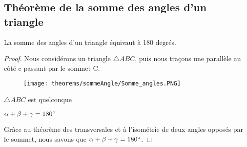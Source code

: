 \documentclass[a4paper,12pt]{article}
\begin{document}
\pagebreak
\subsection{Théorème de la somme des angles d'un triangle}
\begin{theorem}
La somme des angles d'un triangle équivaut à 180 degrés.
\end{theorem}
\begin{proof}

Nous considérons un triangle $\triangle ABC$, puis nous traçons une parallèle au côté c passant par le sommet C.
\begin{figure}[H]
    \centering
    \texttt{[image: theorems/sommeAngle/Somme\_angles.PNG]}
\end{figure}


\begin{hyp}
$\triangle ABC$ est quelconque
\end{hyp}
\begin{concl}
$\alpha + \beta +\gamma = 180 \degree$
\end{concl}
Grâce au théorème des transversales et à l'isométrie de deux angles opposés par le sommet, nous savons que $\alpha + \beta +\gamma = 180 \degree$.
\end{proof}
\end{document}
